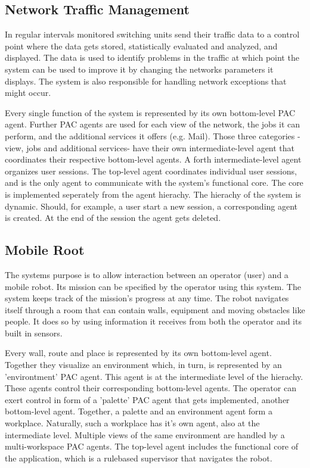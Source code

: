 \documentclass{scrbook}
\begin{document}
\subsection{Network Traffic Management}
In regular intervals monitored switching units send their traffic data to a control point where the data gets
stored, statistically evaluated and analyzed, and displayed. The data is used to identify problems in the traffic
at which point the system can be used to improve it by changing the networks parameters it displays. The
system is also responsible for handling network exceptions that might occur.

Every single function of the system is represented by its own bottom-level PAC agent. Further PAC agents are
used for each view of the network, the jobs it can perform, and the additional services it offers (e.g. Mail).
Those three categories -view, jobs and additional services- have their own intermediate-level agent that
coordinates their respective bottom-level agents. A forth intermediate-level agent organizes user sessions.
The top-level agent coordinates individual user sessions, and is the only agent to communicate with the
system's functional core. The core is implemented seperately from the agent hierachy.
The hierachy of the system is dynamic. Should, for example, a user start a new session, a corresponding agent
is created. At the end of the session the agent gets deleted.

\subsection{Mobile Root}

The systems purpose is to allow interaction between an operator (user) and a mobile robot. Its mission can be
specified by the operator using this system. The system keeps track of the mission's progress at any time.
The robot navigates itself through a room that can contain walls, equipment and moving obstacles like people.
It does so by using information it receives from both the operator and its built in sensors.

Every wall, route and place is represented by its own bottom-level agent. Together they visualize an
environment which, in turn, is represented by an 'environtment' PAC agent. This agent is at the intermediate
level of the hierachy. These agents control their corresponding bottom-level agents.
The operator can exert control in form of a 'palette' PAC agent that gets implemented, another bottom-level
agent.
Together, a palette and an environment agent form a workplace. Naturally, such a workplace has it's own
agent, also at the intermediate level.
Multiple views of the same environment are handled by a multi-workspace PAC agents.
The top-level agent includes the functional core of the application, which is a rulebased supervisor that
navigates the robot.
\end{document}

